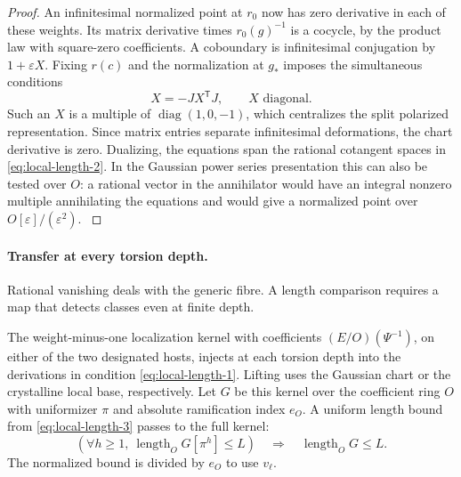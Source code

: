 \begin{proof}
An infinitesimal normalized point at \(r_0\) now has
zero derivative in each of these weights. Its matrix
derivative times \(r_0(g)^{-1}\) is a cocycle, by the
product law with square-zero coefficients. A coboundary
is infinitesimal conjugation by \(1+\varepsilon X\).
Fixing \(r(c)\) and the normalization at \(g_*\) imposes the simultaneous conditions
\[
 X=-JX^{\mathsf T}J,\qquad X\text{ diagonal}.
\] Such an
\(X\) is a multiple of \(\operatorname{diag}(1,0,-1)\),
which centralizes the split polarized representation.
Since matrix entries separate infinitesimal deformations,
the chart derivative is zero. Dualizing, the equations
span the rational cotangent spaces in \eqref{eq:local-length-2}. In the
Gaussian power series presentation this can also be
tested over \(O\): a rational vector in the annihilator
would have an integral nonzero multiple annihilating
the equations and would give a normalized point over
\(O[\varepsilon]/(\varepsilon^2)\).
\hfill\mbox{\cite{bloch-kato-finite,milne-duality}}\label{cor:ordinary-rank-three-length-2}

\end{proof}

\paragraph{Transfer at every torsion depth.}
Rational vanishing deals with the generic fibre. A length comparison requires a map
that detects classes even at finite depth.

\begin{proposition}
\label{prop:rank-three-integral-transfer}
The weight-minus-one localization kernel with coefficients
\((E/O)(\Psi^{-1})\), on either of the two designated hosts,
injects at each torsion depth into the derivations in condition
\textup{\eqref{eq:local-length-1}}. Lifting uses the Gaussian chart or the crystalline
local base, respectively. Let \(G\) be this kernel over the coefficient ring \(O\) with
uniformizer \(\pi\) and absolute ramification index \(e_O\). A uniform
length bound from \eqref{eq:local-length-3} passes to the full kernel:
\[
 (\forall h\ge1,\ \operatorname{length}_O G[\pi^h]\le L)
       \quad\Longrightarrow\quad \operatorname{length}_O G\le L .
\]
The normalized bound is divided by \(e_O\) to use \(v_\ell\).
\end{proposition}

